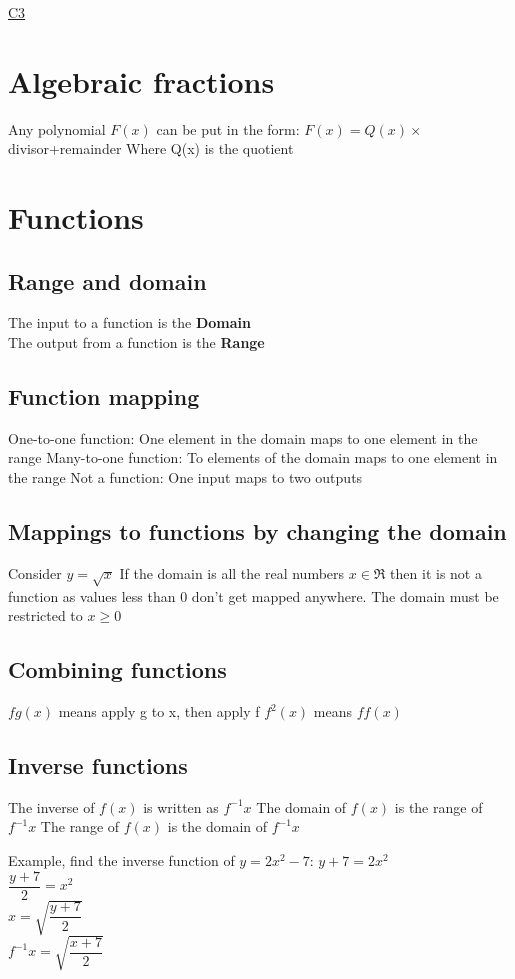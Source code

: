 \documentclass{article}[18pt]
\begin{document}
\begin{center}
\underline{\huge C3}
\end{center}
\begin{obeylines}

\section{Algebraic fractions}
Any polynomial $F(x)$ can be put in the form:
$F(x)=Q(x)\times$divisor+remainder
Where Q(x) is the quotient
\section{Functions}
\subsection{Range and domain}
The input to a function is the \textbf{Domain}\\
The output from a function is the \textbf{Range}
\subsection{Function mapping}
One-to-one function: One element in the domain maps to one element in the range
Many-to-one function: To elements of the domain maps to one element in the range
Not a function: One input maps to two outputs
\subsection{Mappings to functions by changing the domain}
Consider $y=\sqrt{x}$
If the domain is all the real numbers $x \in \Re$ then it is not a function as values less than 0 don't get mapped anywhere.
The domain must be restricted to $x\geq 0$
\subsection{Combining functions}
$fg(x)$ means apply g to x, then apply f
$f^2(x)$ means $ff(x)$
\subsection{Inverse functions}
The inverse of $f(x)$ is written as $f^{-1}x$
The domain of $f(x)$ is the range of $f^{-1}x$
The range of $f(x)$ is the domain of $f^{-1}x$

Example, find the inverse function of $y=2x^2-7$:
$y+7=2x^2$\\
$\dfrac{y+7}{2}=x^2$\\
$x=\sqrt{\dfrac{y+7}{2}}$\\
$f^{-1}x=\sqrt{\dfrac{x+7}{2}}$\\


\end{obeylines}
\end{document}
